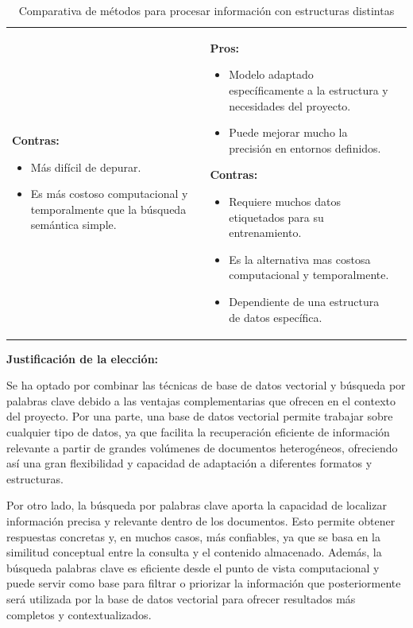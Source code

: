 \documentclass{article}
\begin{document}
\begin{enumerate}
\begin{table}[H]
\begin{tabular}{p{4.5cm}|p{4.5cm}|p{4.5cm}}
    \textbf{Contras:}
    \begin{itemize}[left=0.15pt]
        \item Más difícil de depurar.
        \item Es más costoso computacional y temporalmente que la búsqueda semántica simple.
    \end{itemize}
    &
    \vspace{0.025cm}
    \textbf{Pros:}
    \begin{itemize}[left=0.15pt]
        \item Modelo adaptado específicamente a la estructura y necesidades del proyecto.
        \item Puede mejorar mucho la precisión en entornos definidos.
    \end{itemize}
    \textbf{Contras:}
    \begin{itemize}[left=0.15pt]
        \item Requiere muchos datos etiquetados para su entrenamiento.
        \item Es la alternativa mas costosa computacional y temporalmente.
        \item Dependiente de una estructura de datos específica.
    \end{itemize}
    \\
    \end{tabular}
    \caption{Comparativa de métodos para procesar información con estructuras distintas}
    \end{table}
    
    \textbf{Justificación de la elección:}
    
    Se ha optado por combinar las técnicas de base de datos vectorial y búsqueda por palabras clave debido a las ventajas complementarias que ofrecen en el contexto del proyecto. Por una parte, una base de datos vectorial permite trabajar sobre cualquier tipo de datos, ya que facilita la recuperación eficiente de información relevante a partir de grandes volúmenes de documentos heterogéneos, ofreciendo así una gran flexibilidad y capacidad de adaptación a diferentes formatos y estructuras.
    
    Por otro lado, la búsqueda por palabras clave aporta la capacidad de localizar información precisa y relevante dentro de los documentos. Esto permite obtener respuestas concretas y, en muchos casos, más confiables, ya que se basa en la similitud conceptual entre la consulta y el contenido almacenado. Además, la búsqueda palabras clave es eficiente desde el punto de vista computacional y puede servir como base para filtrar o priorizar la información que posteriormente será utilizada por la base de datos vectorial para ofrecer resultados más completos y contextualizados.
    

\end{enumerate}
\end{document}
